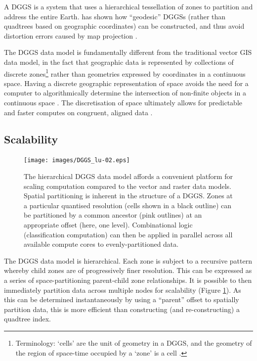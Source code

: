 \documentclass[]{interact}
\theoremstyle{plain}%
\theoremstyle{definition}
\theoremstyle{remark}
\begin{document}
A \ac{DGGS} is a system that uses a hierarchical tessellation of zones to partition and address the entire Earth. \citet{sahr2003geodesic} has shown how ``geodesic'' \acp{DGGS} (rather than quadtrees based on geographic coordinates) can be constructed, and thus avoid distortion errors caused by map projection \citep{goodchild2018reimagining}.

The \ac{DGGS} data model is fundamentally different from the traditional vector \ac{GIS} data model, in the fact that geographic data is represented by collections of discrete zones\footnote{Terminology: `cells' are the unit of geometry in a \ac{DGGS}, and the geometry of the region of space-time occupied by a `zone' is a cell \citep{topic21}.} rather than geometries expressed by coordinates in a continuous space. Having a discrete geographic representation of space avoids the need for a computer to algorithmically determine the intersection of non-finite objects in a continuous space \citep{bentley1979algorithms,robertson2020integrated}. The discretisation of space ultimately allows for predictable and faster computes on congruent, aligned data \citep{dutton1989modelling}.

\subsection{Scalability}

\begin{figure}[t]
    \centering
    \texttt{[image: images/DGGS\_lu-02.eps]}
    \caption{The hierarchical \ac{DGGS} data model affords a convenient platform for scaling computation compared to the vector and raster data models. Spatial partitioning is inherent in the structure of a \ac{DGGS}. Zones at a particular quantised resolution (cells shown in a black outline) can be partitioned by a common ancestor (pink outlines) at an appropriate offset (here, one level). Combinational logic (classification computation) can then be applied in parallel across all available compute cores to evenly-partitioned data.}
    \label{fig:Scalable}
\end{figure}

The \ac{DGGS} data model is hierarchical. Each zone is subject to a recursive pattern whereby child zones are of progressively finer resolution. This can be expressed as a series of space-partitioning parent-child zone relationships. It is possible to then immediately partition data across multiple nodes for scalability (Figure \ref{fig:Scalable}). As this can be determined instantaneously by using a ``parent'' offset to spatially partition data, this is more efficient than constructing (and re-constructing) a quadtree index.
\end{document}
